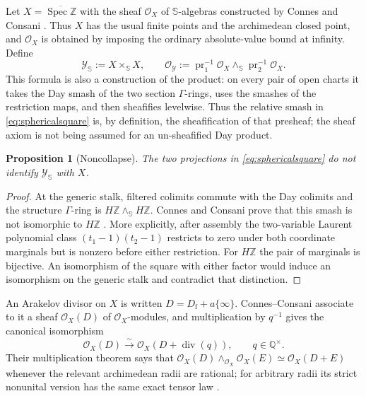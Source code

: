\documentclass[11pt]{amsart}
\newtheorem{proposition}[theorem]{Proposition}
\theoremstyle{definition}
\theoremstyle{remark}
\newcommand{\Z}{\mathbb Z}
\newcommand{\Q}{\mathbb Q}
\newcommand{\divv}{\operatorname{div}}
\newcommand{\Spec}{\operatorname{Spec}}
\begin{document}
Let $X=\overline{\Spec\Z}$ with the sheaf $\mathcal O_X$ of
$\mathbb S$-algebras constructed by Connes and Consani
\cite[Proposition~6.3]{CC-AbsoluteAlgebra}.  Thus $X$ has the usual finite
points and the archimedean closed point, and $\mathcal O_X$ is obtained by
imposing the ordinary absolute-value bound at infinity.  Define
\begin{equation}\label{eq:sphericalsquare}
 \mathscr Y_{\mathbb S}:=X\times_{\mathbb S}X,
 \qquad
 \mathcal O_{\mathscr Y}:=\operatorname{pr}_1^{-1}\mathcal O_X
       \wedge_{\mathbb S}\operatorname{pr}_2^{-1}\mathcal O_X.
\end{equation}
This formula is also a construction of the product: on every pair of open
charts it takes the Day smash of the two section $\Gamma$-rings, uses the
smashes of the restriction maps, and then sheafifies levelwise.  Thus the
relative smash in \eqref{eq:sphericalsquare} is, by definition, the
sheafification of that presheaf; the sheaf axiom is not being assumed for an
un-sheafified Day product.

\begin{proposition}[Noncollapse]\label{prop:sphericalnoncollapse}
The two projections in \eqref{eq:sphericalsquare} do not identify
$\mathscr Y_{\mathbb S}$ with $X$.
\end{proposition}

\begin{proof}
At the generic stalk, filtered colimits commute with the Day colimits and
the structure $\Gamma$-ring is
$H\Z\wedge_{\mathbb S}H\Z$.  Connes and Consani prove that this smash is not
isomorphic to $H\Z$ \cite[Proposition~7.4]{CC-AbsoluteAlgebra}.  More
explicitly, after assembly the two-variable Laurent polynomial class
$(t_1-1)(t_2-1)$ restricts to zero under both coordinate marginals but is
nonzero before either restriction.  For $H\Z$ the pair of marginals is
bijective.  An isomorphism of the square with either factor would induce an
isomorphism on the generic stalk and contradict that distinction.
\end{proof}

An Arakelov divisor on $X$ is written $D=D_{\mathrm f}+a\{\infty\}$.
Connes--Consani associate to it a sheaf $\mathcal O_X(D)$ of
$\mathcal O_X$-modules, and multiplication by $q^{-1}$ gives the canonical
isomorphism
\begin{equation}\label{eq:principalmodule}
 \mathcal O_X(D)\xrightarrow{\ \sim\ }
 \mathcal O_X(D+\divv(q)),\qquad q\in\Q^\times.
\end{equation}
Their multiplication theorem says that
$\mathcal O_X(D)\wedge_{\mathcal O_X}\mathcal O_X(E)\simeq
\mathcal O_X(D+E)$ whenever the relevant archimedean radii are rational;
for arbitrary radii its strict nonunital version has the same exact tensor
law \cite[Proposition~6.4 and Remark~6.5]{CC-AbsoluteAlgebra}.
\end{document}
